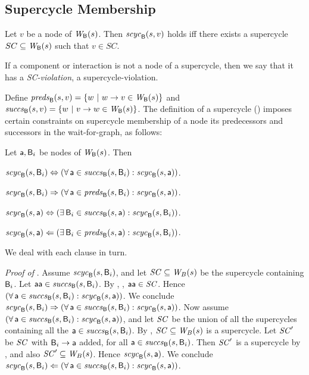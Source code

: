 

\subsection{Supercycle Membership} 


\label{defn:supercycle.membership}
Let $v$ be a node of $\wfg{\B}{s}$. Then
$\scyc{\B}{s}{v}$ holds iff there exists a supercycle $SC \sub
\wfg{\B}{s}$ such that $v \in SC$. 
\ed

If a component or interaction is not a node of a supercycle, then we say that it has a
\emph{SC-violation}, \ie a supercycle-violation.
%

Define
$\preds{\B}{s}{v} = \set{w \stt w \ar v \in \wfg{\B}{s}}$ and 
$\succs{\B}{s}{v} = \set{w \stt v \ar w \in \wfg{\B}{s}}$.
The definition of a supercycle () 
imposes certain constraints on supercycle membership of a node \wrt its predecessors and successors
in the wait-for-graph, as follows:

\label{prop:sc-membership}
Let $\act, \B_i$ be nodes of $\wfg{\B}{s}$. Then
\bn

\item \label{clause:sc-membership:comp-out}
$\scyc{\B}{s}{\B_i} \ifof (\fa \act \in \succs{\B}{s}{\B_i} : \scyc{\B}{s}{\act})$.

\item \label{clause:sc-membership:comp-in}
$\scyc{\B}{s}{\B_i} \imp (\fa \act \in \preds{\B}{s}{\B_i} : \scyc{\B}{s}{\act})$.

\item \label{clause:sc-membership:act-out}
$\scyc{\B}{s}{\act} \ifof (\ex \B_i \in \succs{\B}{s}{\act} : \scyc{\B}{s}{\B_i})$.

\item \label{clause:sc-membership:act-in}
$\scyc{\B}{s}{\act} \folf (\ex \B_i \in \preds{\B}{s}{\act} : \scyc{\B}{s}{\B_i})$.

\en
\ep
%
\bpr
We deal with each clause in turn.


\textit{Proof of }.
%
Assume $\scyc{\B}{s}{\B_i}$, and let $\SC \sub \wfg{B}{s}$ be the supercycle containing $\B_i$.  Let
$\actp \in \succs{\B}{s}{\B_i}$.  By , ,
$\actp \in \SC$.  Hence $(\fa \act \in \succs{\B}{s}{\B_i} : \scyc{\B}{s}{\act})$.
We conclude
$\scyc{\B}{s}{\B_i} \imp (\fa \act \in \succs{\B}{s}{\B_i} : \scyc{\B}{s}{\act})$.
%
Now assume $(\fa \act \in \succs{\B}{s}{\B_i} : \scyc{\B}{s}{\act})$, and let 
$\SC$ be the union of all the supercycles containing all the $\act \in \succs{\B}{s}{\B_i}$. 
By , $\SC \sub \wfg{B}{s}$ is a supercycle.
Let $\SC'$ be $\SC$ with $\B_i \ar \act$ added, for all 
$\act \in \succs{\B}{s}{\B_i}$.
Then $\SC'$ is a supercycle by 
, and also $\SC' \sub \wfg{B}{s}$. Hence $\scyc{\B}{s}{\act}$.
We conclude 
$\scyc{\B}{s}{\B_i} \folf (\fa \act \in \succs{\B}{s}{\B_i} : \scyc{\B}{s}{\act})$.




